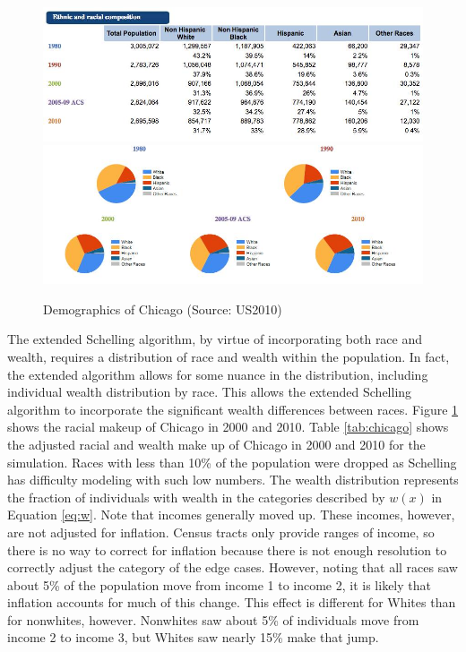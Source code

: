 {\begin{figure}[h!]
\centering
\includegraphics[scale=0.5]{figures/chart4.png}
\includegraphics[scale=0.4]{figures/chart3.png}
\caption[Demographics of Chicago]{Demographics of Chicago (Source: US2010)\cite{brown10}}
\label{tab:chicago2}
\end{figure}


The extended Schelling algorithm, by virtue of incorporating both race and wealth, requires a distribution of race and wealth within the population. In fact, the extended algorithm allows for some nuance in the distribution, including individual wealth distribution by race. This allows the extended Schelling algorithm to incorporate the significant wealth differences between races. Figure \ref{tab:chicago2} shows the racial makeup of Chicago in 2000 and 2010. Table \ref{tab:chicago} shows the adjusted racial and wealth make up of Chicago in 2000 and 2010 for the simulation. Races with less than 10\% of the population were dropped as Schelling has difficulty modeling with such low numbers. The wealth distribution represents the fraction of individuals with wealth in the categories described by $w(x)$ in Equation \ref{eq:w}. Note that incomes generally moved up. These incomes, however, are not adjusted for inflation. Census tracts only provide ranges of income, so there is no way to correct for inflation because there is not enough resolution to correctly adjust the category of the edge cases. However, noting that all races saw about 5\% of the population move from income 1 to income 2, it is likely that inflation accounts for much of this change. This effect is different for Whites than for nonwhites, however. Nonwhites saw about 5\% of individuals move from income 2 to income 3, but Whites saw nearly 15\% make that jump.

}
